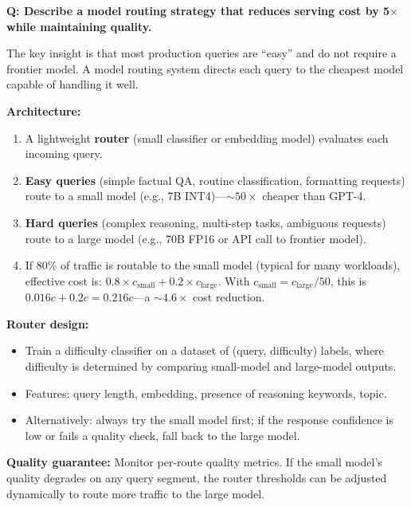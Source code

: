 \begin{interviewq}
\textbf{Q: Describe a model routing strategy that reduces serving cost by 5$\times$ while
maintaining quality.}

 \quad {} \quad \badgefreq{\freqlow}

\stronganswer
The key insight is that most production queries are ``easy'' and do not require a
frontier model.  A model routing system directs each query to the cheapest model capable
of handling it well.

\textbf{Architecture:}
\begin{enumerate}
    \item A lightweight \textbf{router} (small classifier or embedding model) evaluates
          each incoming query.
    \item \textbf{Easy queries} (simple factual QA, routine classification, formatting
          requests) route to a small model (e.g., 7B INT4)---$\sim$$50\times$ cheaper
          than GPT-4.
    \item \textbf{Hard queries} (complex reasoning, multi-step tasks, ambiguous requests)
          route to a large model (e.g., 70B FP16 or API call to frontier model).
    \item If 80\% of traffic is routable to the small model (typical for many workloads),
          effective cost is: $0.8 \times c_{\text{small}} + 0.2 \times c_{\text{large}}$.
          With $c_{\text{small}} = c_{\text{large}} / 50$, this is $0.016c + 0.2c =
          0.216c$---a $\sim$$4.6\times$ cost reduction.
\end{enumerate}

\textbf{Router design:}
\begin{itemize}
    \item Train a difficulty classifier on a dataset of (query, difficulty) labels, where
          difficulty is determined by comparing small-model and large-model outputs.
    \item Features: query length, embedding, presence of reasoning keywords, topic.
    \item Alternatively: always try the small model first; if the response confidence is
          low or fails a quality check, fall back to the large model.
\end{itemize}

\textbf{Quality guarantee:}  Monitor per-route quality metrics.  If the small model's
quality degrades on any query segment, the router thresholds can be adjusted dynamically
to route more traffic to the large model.


\end{interviewq}
